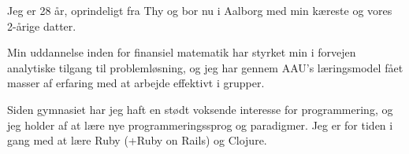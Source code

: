 \documentclass[9pt]{template/developercv}
\begin{document}
\begin{minipage}[t]{0.5\textwidth}
  \vspace{-\baselineskip}

  Jeg er 28 år, oprindeligt fra Thy og bor nu i Aalborg med min kæreste og vores 2-årige datter.

  \medskip
  Min uddannelse inden for finansiel matematik har styrket min i forvejen analytiske tilgang til problemløsning, og jeg har gennem AAU's læringsmodel fået masser af erfaring med at arbejde effektivt i grupper.

  \medskip
  Siden gymnasiet har jeg haft en stødt voksende interesse for programmering, og jeg holder af at lære nye programmeringssprog og paradigmer.
  Jeg er for tiden i gang med at lære Ruby (+Ruby on Rails) og Clojure.

\end{minipage}
\hfill
\begin{minipage}[t]{0.25\textwidth}
  \vspace{-\baselineskip}
  \begin{barchart}{2.5}
  \end{barchart}
\end{minipage}
\hfill
\begin{minipage}[t]{0.15\textwidth}
  \vspace{-\baselineskip}
  \begin{barchart}{2.5}
  \end{barchart}
\end{minipage}

\begin{center}
\end{center}
\end{document}
